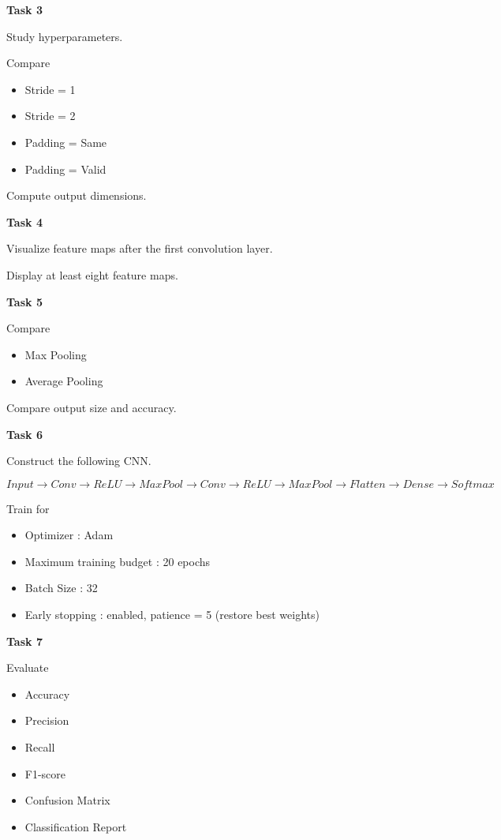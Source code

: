 \documentclass[11pt]{article}
\begin{document}
\textbf{Task 3}

Study hyperparameters.

Compare

\begin{itemize}
\item Stride = 1
\item Stride = 2
\item Padding = Same
\item Padding = Valid
\end{itemize}

Compute output dimensions.

\textbf{Task 4}

Visualize feature maps after the first convolution layer.

Display at least eight feature maps.

\textbf{Task 5}

Compare

\begin{itemize}
\item Max Pooling
\item Average Pooling
\end{itemize}

Compare output size and accuracy.

\textbf{Task 6}

Construct the following CNN.

\[
Input
\rightarrow
Conv
\rightarrow
ReLU
\rightarrow
MaxPool
\rightarrow
Conv
\rightarrow
ReLU
\rightarrow
MaxPool
\rightarrow
Flatten
\rightarrow
Dense
\rightarrow
Softmax
\]

Train for

\begin{itemize}
\item Optimizer : Adam
\item Maximum training budget : 20 epochs
\item Batch Size : 32
\item Early stopping : enabled, patience = 5 (restore best weights)
\end{itemize}

\textbf{Task 7}

Evaluate

\begin{itemize}
\item Accuracy
\item Precision
\item Recall
\item F1-score
\item Confusion Matrix
\item Classification Report
\end{itemize}
\end{document}
